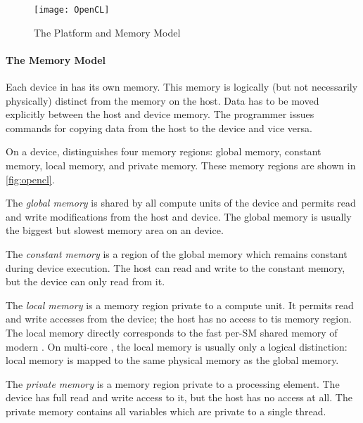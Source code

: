 \begin{figure}
  \centering
  \texttt{[image: OpenCL]}
  \caption{The \OpenCL Platform and Memory Model}
  \label{fig:opencl}
\end{figure}

\paragraph{The \OpenCL Memory Model}
Each device in \OpenCL has its own memory.
This memory is logically (but not necessarily physically) distinct from the memory on the host.
Data has to be moved explicitly between the host and device memory.
The programmer issues commands for copying data from the host to the device and vice versa.

On a device, \OpenCL distinguishes four memory regions:
global memory, constant memory, local memory, and private memory.
These memory regions are shown in \autoref{fig:opencl}.

The \emph{global memory} is shared by all compute units of the device and permits read and write modifications from the host and device.
The global memory is usually the biggest but slowest memory area on an \OpenCL device.

The \emph{constant memory} is a region of the global memory which remains constant during device execution.
The host can read and write to the constant memory, but the device can only read from it.

The \emph{local memory} is a memory region private to a compute unit.
It permits read and write accesses from the device; the host has no access to tis memory region.
The local memory directly corresponds to the fast per-SM shared memory of modern \GPUs.
On multi-core \CPUs, the local memory is usually only a logical distinction:
local memory is mapped to the same physical memory as the global memory.

The \emph{private memory} is a memory region private to a processing element.
The device has full read and write access to it, but the host has no access at all.
The private memory contains all variables which are private to a single thread.


